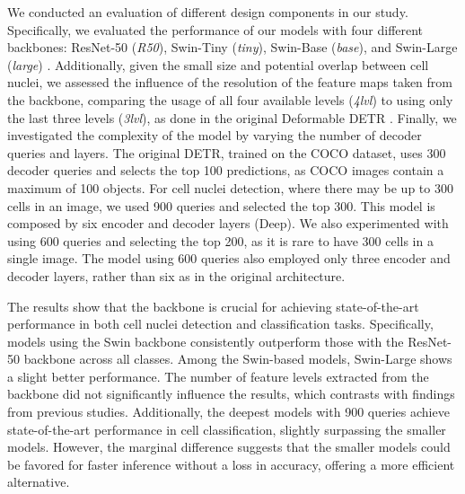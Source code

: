 We conducted an evaluation of different design components in our study. Specifically, we evaluated the performance of our models with four different backbones: ResNet-50 \cite{he2016deep} (\textit{R50}), Swin-Tiny (\textit{tiny}), Swin-Base (\textit{base}), and Swin-Large (\textit{large}) \cite{liu2021swin}. Additionally, given the small size and potential overlap between cell nuclei, we assessed the influence of the resolution of the feature maps taken from the backbone, comparing the usage of all four available levels (\textit{4lvl}) to using only the last three levels (\textit{3lvl}), as done in the original Deformable DETR \cite{zhu2020deformable}. Finally, we investigated the complexity of the model by varying the number of decoder queries and layers. The original DETR, trained on the COCO dataset, uses 300 decoder queries and selects the top 100 predictions, as COCO images contain a maximum of 100 objects. For cell nuclei detection, where there may be up to 300 cells in an image, we used 900 queries and selected the top 300. This model is composed by six encoder and decoder layers (Deep). We also experimented with using 600 queries and selecting the top 200, as it is rare to have 300 cells in a single image. The model using 600 queries also employed only three encoder and decoder layers, rather than six as in the original architecture.

The results show that the backbone is crucial for achieving state-of-the-art performance in both cell nuclei detection and classification tasks. Specifically, models using the Swin backbone consistently outperform those with the ResNet-50 backbone across all classes. Among the Swin-based models, Swin-Large shows a slight better performance. The number of feature levels extracted from the backbone did not significantly influence the results, which contrasts with findings from previous studies. Additionally, the deepest models with 900 queries achieve state-of-the-art performance in cell classification, slightly surpassing the smaller models. However, the marginal difference suggests that the smaller models could be favored for faster inference without a loss in accuracy, offering a more efficient alternative.


